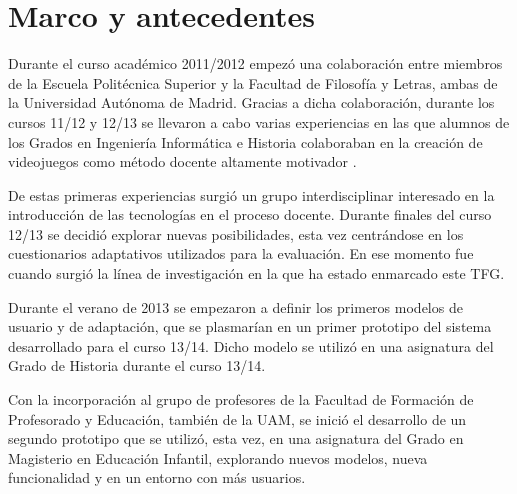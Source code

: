 


\section{Marco y antecedentes}


Durante el curso académico 2011/2012 empezó una colaboración entre miembros de la Escuela Politécnica Superior y la Facultad de Filosofía y Letras, ambas de la Universidad Autónoma de Madrid. Gracias a dicha colaboración, durante los cursos 11/12 y 12/13 se llevaron a cabo varias experiencias en las que alumnos de los Grados en Ingeniería Informática e Historia colaboraban en la creación de videojuegos como método docente altamente motivador  \cite{Sevilla12}\cite{Molins14Videogames}.

De estas primeras experiencias surgió un grupo interdisciplinar interesado en la introducción de las tecnologías en el proceso docente. Durante finales del curso 12/13 se decidió explorar nuevas posibilidades, esta vez centrándose en los cuestionarios adaptativos utilizados para la evaluación. En ese momento fue cuando surgió la línea de investigación en la que ha estado enmarcado este TFG. 

Durante el verano de 2013 se empezaron a definir los primeros modelos de usuario y de adaptación, que se plasmarían en un primer prototipo del sistema desarrollado para el curso 13/14. Dicho modelo se utilizó en una asignatura del Grado de Historia durante el curso 13/14.

Con la incorporación al grupo de profesores de la Facultad de Formación de Profesorado y Educación, también de la UAM, se inició el desarrollo de un segundo prototipo que se utilizó, esta vez, en una asignatura del Grado en Magisterio en Educación Infantil, explorando nuevos modelos, nueva funcionalidad y en un entorno con más usuarios.

